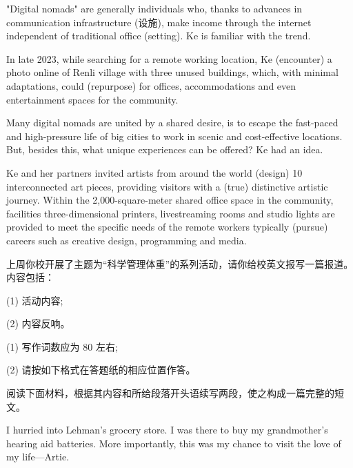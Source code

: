 \documentclass{英语试卷}
\begin{document}
\par "Digital nomads" are generally individuals who, thanks to advances in communication infrastructure (设施), make income through the internet independent of traditional office  (setting). Ke is familiar with the trend.\par
\par In late 2023, while searching for a remote working location, Ke  (encounter) a photo online of Renli village with three unused buildings, which, with minimal adaptations, could  (repurpose) for offices, accommodations and even entertainment spaces for the community.\par
\par Many digital nomads are united by a shared desire,  is to escape the fast-paced and high-pressure life of big cities to work in scenic and cost-effective locations. But, besides this, what unique experiences can be offered? Ke had an idea.\par
\par Ke and her partners invited artists from around the world  (design) 10 interconnected art pieces, providing visitors with a  (true) distinctive artistic journey. Within the 2,000-square-meter shared office space in the community, facilities  three-dimensional printers, livestreaming rooms and studio lights are provided to meet the specific needs of the remote workers typically  (pursue) careers such as creative design, programming and media.\par
{}
\par 上周你校开展了主题为“科学管理体重”的系列活动，请你给校英文报写一篇报道。内容包括：\par
\par (1) 活动内容;\par
\par (2) 内容反响。\par
\par (1) 写作词数应为 80 左右;\par
\par (2) 请按如下格式在答题纸的相应位置作答。\par
{}
\par 阅读下面材料，根据其内容和所给段落开头语续写两段，使之构成一篇完整的短文。\par
\par I hurried into Lehman's grocery store. I was there to buy my grandmother's hearing aid batteries. More importantly, this was my chance to visit the love of my life—Artie.\par
\end{document}
